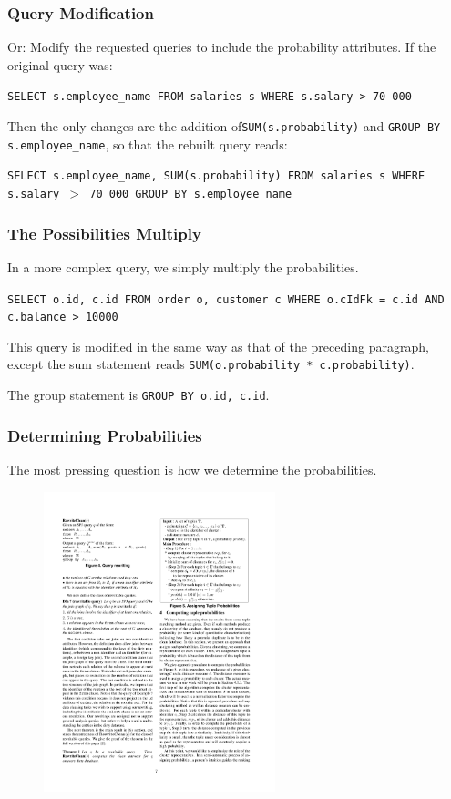 \begin{frame}
\frametitle{Query Modification}

Or: Modify the requested queries to include the probability attributes. If the original query was:

\texttt{SELECT s.employee\_name FROM salaries s WHERE s.salary > 70~000}


Then the only changes are the addition of\texttt{SUM(s.probability)} and \texttt{GROUP BY s.employee\_name}, so that the rebuilt query reads:


\texttt{SELECT s.employee\_name, SUM(s.probability) FROM salaries s WHERE s.salary $>$ 70~000 GROUP BY s.employee\_name}


\end{frame}


\begin{frame}
\frametitle{The Possibilities Multiply}

In a more complex query, we simply multiply the probabilities. 

\texttt{SELECT o.id, c.id FROM order o, customer c  WHERE o.cIdFk = c.id AND c.balance > 10000 }


This query is modified in the same way as that of the preceding paragraph, except the sum statement reads \texttt{SUM(o.probability * c.probability)}.

The group statement is \texttt{GROUP BY o.id, c.id}.


\end{frame}


\begin{frame}
\frametitle{Determining Probabilities}

The most pressing question is how we determine the probabilities. 

\begin{figure}[!h]
  \centering \includegraphics[width=0.6\textwidth]{images/formula.pdf}
\end{figure}

\end{frame}


